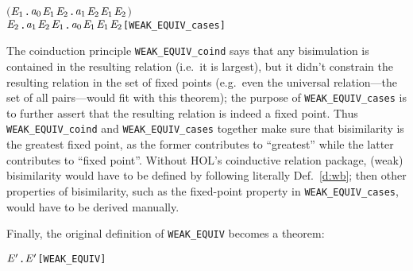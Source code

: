 \begin{itemize}
\begin{alltt}
       \ensuremath{(}\HOLSymConst{\HOLTokenForall{}}\ensuremath{\HOLBoundVar{E}\sb{\mathrm{1}}}. \ensuremath{\HOLBoundVar{a}\sb{\mathrm{0}}} \HOLTokenTransBegin\HOLSymConst{\ensuremath{\tau}}\HOLTokenTransEnd \ensuremath{\HOLBoundVar{E}\sb{\mathrm{1}}} \HOLSymConst{\HOLTokenImp{}} \HOLSymConst{\HOLTokenExists{}}\ensuremath{\HOLBoundVar{E}\sb{\mathrm{2}}}. \ensuremath{\HOLBoundVar{a}\sb{\mathrm{1}}} \HOLSymConst{\HOLTokenEPS} \ensuremath{\HOLBoundVar{E}\sb{\mathrm{2}}} \HOLSymConst{\HOLTokenConj{}} \ensuremath{\HOLBoundVar{E}\sb{\mathrm{1}}} \HOLSymConst{\HOLTokenWeakEQ} \ensuremath{\HOLBoundVar{E}\sb{\mathrm{2}}}\ensuremath{)} \HOLSymConst{\HOLTokenConj{}}
       \HOLSymConst{\HOLTokenForall{}}\ensuremath{\HOLBoundVar{E}\sb{\mathrm{2}}}. \ensuremath{\HOLBoundVar{a}\sb{\mathrm{1}}} \HOLTokenTransBegin\HOLSymConst{\ensuremath{\tau}}\HOLTokenTransEnd \ensuremath{\HOLBoundVar{E}\sb{\mathrm{2}}} \HOLSymConst{\HOLTokenImp{}} \HOLSymConst{\HOLTokenExists{}}\ensuremath{\HOLBoundVar{E}\sb{\mathrm{1}}}. \ensuremath{\HOLBoundVar{a}\sb{\mathrm{0}}} \HOLSymConst{\HOLTokenEPS} \ensuremath{\HOLBoundVar{E}\sb{\mathrm{1}}} \HOLSymConst{\HOLTokenConj{}} \ensuremath{\HOLBoundVar{E}\sb{\mathrm{1}}} \HOLSymConst{\HOLTokenWeakEQ} \ensuremath{\HOLBoundVar{E}\sb{\mathrm{2}}}\hfill{[WEAK_EQUIV_cases]}
\end{alltt}
\end{itemize}

The coinduction principle \texttt{WEAK_EQUIV_coind} says that any
bisimulation is contained in the resulting relation (i.e.~it is
largest), but it didn't constrain the resulting relation in the set of
fixed points (e.g.~even the universal relation---the set of all
pairs---would fit with this theorem); the
purpose of \texttt{WEAK_EQUIV_cases} is to
further assert that the resulting relation is indeed a
fixed point. Thus \texttt{WEAK_EQUIV_coind} and \texttt{WEAK_EQUIV_cases}
together make sure that bisimilarity is the greatest
fixed point, as
the former contributes to ``greatest'' while the latter
contributes to ``fixed point''.
%
Without HOL's coinductive relation package, (weak) bisimilarity
would have to be defined by following literally
Def.~\ref{d:wb};  then other properties of bisimilarity, such
as the fixed-point property in \texttt{WEAK_EQUIV_cases}, would have to be
derived manually.

Finally, the original definition of \texttt{WEAK_EQUIV}
becomes a theorem:
\begin{alltt}
\HOLTokenTurnstile{}  \HOLSymConst{\HOLTokenWeakEQ} \ensuremath{\HOLFreeVar{E}\sp{\prime}} \HOLSymConst{\HOLTokenEquiv{}} \HOLSymConst{\HOLTokenExists{}}.   \ensuremath{\HOLFreeVar{E}\sp{\prime}} \HOLSymConst{\HOLTokenConj{}}  \hfill{[WEAK_EQUIV]}
\end{alltt}

